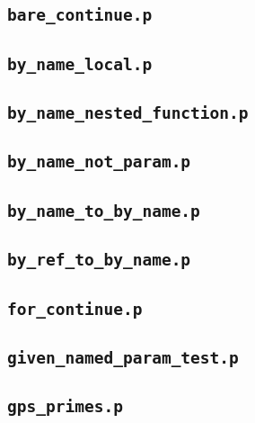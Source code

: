 \subsection{\textbf{\texttt{bare\_continue.p}}}


\subsection{\textbf{\texttt{by\_name\_local.p}}}


\subsection{\textbf{\texttt{by\_name\_nested\_function.p}}}


\subsection{\textbf{\texttt{by\_name\_not\_param.p}}}


\subsection{\textbf{\texttt{by\_name\_to\_by\_name.p}}}


\subsection{\textbf{\texttt{by\_ref\_to\_by\_name.p}}}


\subsection{\textbf{\texttt{for\_continue.p}}}


\subsection{\textbf{\texttt{given\_named\_param\_test.p}}}


\subsection{\textbf{\texttt{gps\_primes.p}}}


